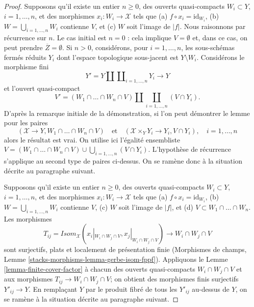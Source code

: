 \begin{proof}
\medskip\noindent
Supposons qu'il existe un entier $n \geq 0$, des ouverts quasi-compacts
$W_i \subset Y$, $i = 1, \ldots, n$, et des
morphismes $x_i : W_i \to \mathcal{X}$ tels que
(a) $f \circ x_i = \text{id}_{W_i}$,
(b) $W = \bigcup_{i = 1, \ldots, n} W_i$ contienne $V$, et
(c) $W$ soit l'image de $|f|$.
Nous raisonnons par récurrence sur $n$. Le cas initial est $n = 0$ : cela
implique $V = \emptyset$ et, dans ce cas, on peut prendre
$\overline{Z} = \emptyset$.
Si $n > 0$, considérons, pour $i = 1, \ldots, n$,
les sous-schémas fermés réduits
$Y_i$ dont l'espace topologique sous-jacent est
$Y \setminus W_i$. Considérons le morphisme fini
$$
Y' = Y \amalg \coprod\nolimits_{i = 1, \ldots, n} Y_i \longrightarrow Y
$$
et l'ouvert quasi-compact
$$
V' = (W_1 \cap \ldots \cap W_n \cap V) \amalg
\coprod_{i = 1, \ldots, n} (V \cap Y_i).
$$
D'après la remarque initiale de la démonstration, si l'on peut démontrer le lemme pour les paires
$$
(\mathcal{X} \to Y, W_1 \cap \ldots \cap W_n \cap V)
\quad\text{et}\quad
(\mathcal{X} \times_Y Y_i \to Y_i, V \cap Y_i),\quad
i = 1, \ldots, n
$$
alors le résultat est vrai. On utilise ici l'égalité ensembliste
$V = (W_1 \cap \ldots \cap W_n \cap V) \cup
\bigcup\nolimits_{i = 1, \ldots, n} (V \cap Y_i)$.
L'hypothèse de récurrence s'applique au second type de
paires ci-dessus. On se ramène donc à la situation décrite au
paragraphe suivant.

\medskip\noindent
Supposons qu'il existe un entier $n \geq 0$, des ouverts quasi-compacts
$W_i \subset Y$, $i = 1, \ldots, n$, et des
morphismes $x_i : W_i \to \mathcal{X}$ tels que
(a) $f \circ x_i = \text{id}_{W_i}$,
(b) $W = \bigcup_{i = 1, \ldots, n} W_i$ contienne $V$,
(c) $W$ soit l'image de $|f|$, et
(d) $V \subset W_1 \cap \ldots \cap W_n$.
Les morphismes
$$
T_{ij} = \mathit{Isom}_\mathcal{X}(x_i|_{W_i \cap W_j \cap V},
x_j|_{W_i \cap W_j \cap V}) \longrightarrow W_i \cap W_j \cap V
$$
sont surjectifs, plats et localement de présentation finie
(Morphismes de champs, Lemme \ref{stacks-morphisms-lemma-gerbe-isom-fppf}).
Appliquons le Lemme \ref{lemma-finite-cover-factor}
à chacun des ouverts quasi-compacts $W_i \cap W_j \cap V$ et aux morphismes
$T_{ij} \to W_i \cap W_j \cap V$; on obtient des morphismes finis surjectifs
$Y'_{ij} \to Y$. En remplaçant $Y$ par le produit fibré de tous
les $Y'_{ij}$ au-dessus de $Y$, on se ramène à la situation décrite
au paragraphe suivant.


\end{proof}
